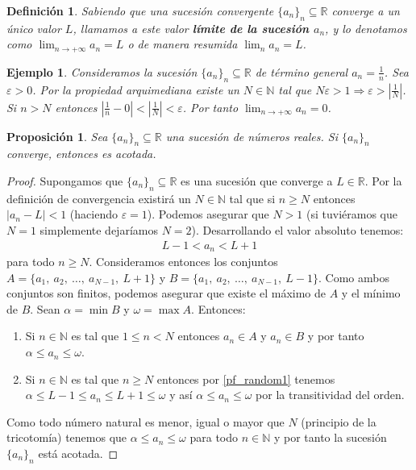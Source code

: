 \documentclass{article}
\newtheorem{prop}{Proposición}
\newtheorem{define}{Definición}
\newtheorem{ejem}{Ejemplo}
\newcommand{\reales}{\mathbb{R}}
\newcommand{\naturales}{\mathbb{N}}
\newcommand{\sucesion}[1]{\{ #1 _n \}_n}
\newcommand{\sucreal}[1]{\{ #1 _n \}_n \subseteq \reales}
\newcommand{\limiten}[1]{\lim_{n \rightarrow +\infty} #1}
\begin{document}
\begin{define}
	Sabiendo que una sucesión convergente $\{ a_n\}_n \subseteq \mathbb{R}$ converge a un único valor $L$, llamamos a este valor \textbf{límite de la sucesión $a_n$}, y lo denotamos como
	$\lim_{n\rightarrow +\infty} a_n = L$ o de manera resumida $\lim_{n} a_n = L$.
\end{define}

\begin{ejem}
	Consideramos la sucesión $\sucreal{a}$ de término general $a_n = \frac{1}{n}$. Sea $\varepsilon > 0 $. Por la propiedad arquimediana existe un $N \in \naturales$ tal que $N\varepsilon > 1 \Rightarrow \varepsilon > |\frac{1}{N}|$. Si $n > N$ entonces $|\frac{1}{n} - 0| < |\frac{1}{N}| < \varepsilon$. Por tanto $\limiten{a_n} = 0$.
\end{ejem}


\begin{prop}
	Sea $\{ a_n\}_n \subseteq \mathbb{R}$ una sucesión de números reales. Si $\{ a_n\}_n$ converge, entonces es acotada.
\end{prop}

\begin{proof}
	Supongamos que $\sucreal{a}$ es una sucesión que converge a $L \in \reales$. Por la definición de convergencia existirá un $N \in \naturales$ tal que si $n \geq N$ entonces $|a_n - L| < 1$ (haciendo $\varepsilon = 1$). Podemos asegurar que $N > 1$ (si tuviéramos que $N = 1$ simplemente dejaríamos $N = 2$). Desarrollando el valor absoluto tenemos:
	\begin{align}\label{pf_random1}
		L - 1 < a_n < L + 1
	\end{align}	
	para todo $n \geq N$. Consideramos entonces los conjuntos $A = \{ a_1,\ a_2,\ \ldots,\ a_{N-1},\  L+1\}$ y $B = \{ a_1,\ a_2,\ \ldots,\ a_{N-1},\ L-1\}$. Como ambos conjuntos son finitos, podemos asegurar que existe el máximo de $A$ y el mínimo de $B$. Sean $\alpha = \min B$ y $\omega = \max A$. Entonces:
	\begin{enumerate}
	\item
	Si $n \in \naturales$ es tal que $1 \leq n < N$ entonces $a_n \in A$ y $a_n \in B$ y por tanto $\alpha \leq a_n \leq \omega$.
	\item
	Si $n \in \naturales$ es tal que $n \geq N$ entonces por \eqref{pf_random1} tenemos $\alpha \leq L - 1 \leq a_n \leq L + 1 \leq \omega$ y así $\alpha \leq a_n \leq \omega$ por la transitividad del orden.
	\end{enumerate}	 
	Como todo número natural es menor, igual o mayor que $N$ (principio de la tricotomía) tenemos que $\alpha \leq a_n \leq \omega$ para todo $n \in \naturales$ y por tanto la sucesión $\sucesion{a}$ está acotada.
\end{proof}
\end{document}
